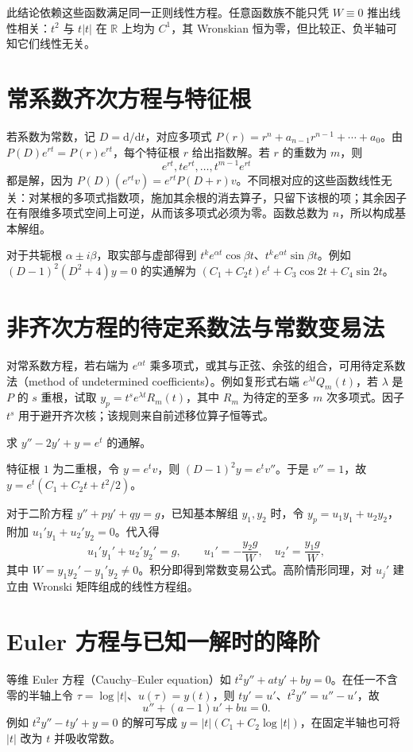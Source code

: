 此结论依赖这些函数满足同一正则线性方程。任意函数族不能只凭 $W\equiv0$ 推出线性相关：$t^2$ 与 $t|t|$ 在 $\mathbb R$ 上均为 $C^1$，其 Wronskian 恒为零，但比较正、负半轴可知它们线性无关。

\section{常系数齐次方程与特征根}
若系数为常数，记 $D=\mathrm d/\mathrm dt$，对应多项式 $P(r)=r^n+a_{n-1}r^{n-1}+\cdots+a_0$。由 $P(D)e^{rt}=P(r)e^{rt}$，每个特征根 $r$ 给出指数解。若 $r$ 的重数为 $m$，则
\[
 e^{rt},te^{rt},\ldots,t^{m-1}e^{rt}
\]
都是解，因为 $P(D)(e^{rt}v)=e^{rt}P(D+r)v$。不同根对应的这些函数线性无关：对某根的多项式指数项，施加其余根的消去算子，只留下该根的项；其余因子在有限维多项式空间上可逆，从而该多项式必须为零。函数总数为 $n$，所以构成基本解组。

对于共轭根 $\alpha\pm i\beta$，取实部与虚部得到 $t^ke^{\alpha t}\cos\beta t$、$t^ke^{\alpha t}\sin\beta t$。例如 $(D-1)^2(D^2+4)y=0$ 的实通解为 $(C_1+C_2t)e^t+C_3\cos2t+C_4\sin2t$。

\section{非齐次方程的待定系数法与常数变易法}
对常系数方程，若右端为 $e^{\alpha t}$ 乘多项式，或其与正弦、余弦的组合，可用待定系数法（method of undetermined coefficients）。例如复形式右端 $e^{\lambda t}Q_m(t)$，若 $\lambda$ 是 $P$ 的 $s$ 重根，试取 $y_p=t^se^{\lambda t}R_m(t)$，其中 $R_m$ 为待定的至多 $m$ 次多项式。因子 $t^s$ 用于避开齐次核；该规则来自前述移位算子恒等式。

\begin{example}
求 $y''-2y'+y=e^t$ 的通解。
\end{example}
\begin{solve}
特征根 $1$ 为二重根，令 $y=e^tv$，则 $(D-1)^2y=e^tv''$。于是 $v''=1$，故 $y=e^t(C_1+C_2t+t^2/2)$。
\end{solve}

对于二阶方程 $y''+py'+qy=g$，已知基本解组 $y_1,y_2$ 时，令 $y_p=u_1y_1+u_2y_2$，附加 $u_1'y_1+u_2'y_2=0$。代入得
\[
 u_1'y_1'+u_2'y_2'=g,\qquad
 u_1'=-\frac{y_2g}{W},\quad u_2'=\frac{y_1g}{W},
\]
其中 $W=y_1y_2'-y_1'y_2\ne0$。积分即得到常数变易公式。高阶情形同理，对 $u_j'$ 建立由 Wronski 矩阵组成的线性方程组。

\section{Euler 方程与已知一解时的降阶}
等维 Euler 方程（Cauchy--Euler equation）如 $t^2y''+aty'+by=0$。在任一不含零的半轴上令 $\tau=\log|t|$、$u(\tau)=y(t)$，则 $ty'=u'$、$t^2y''=u''-u'$，故
\[
 u''+(a-1)u'+bu=0.
\]
例如 $t^2y''-ty'+y=0$ 的解可写成 $y=|t|(C_1+C_2\log|t|)$，在固定半轴也可将 $|t|$ 改为 $t$ 并吸收常数。

